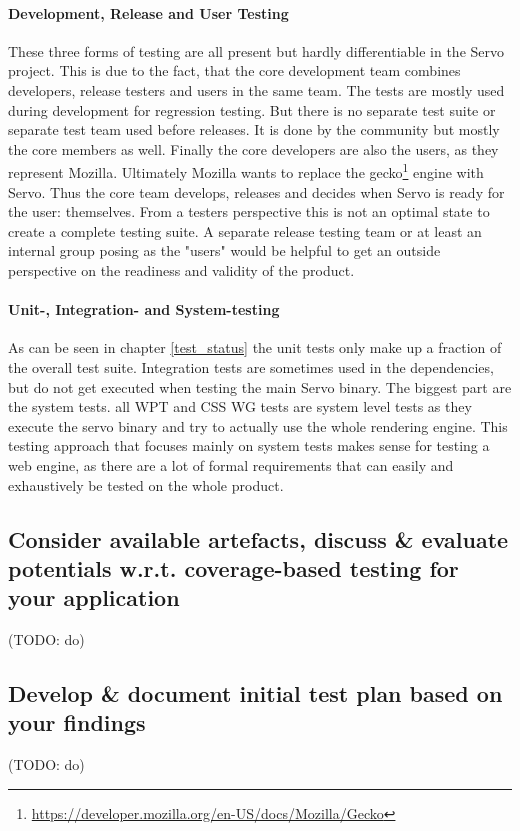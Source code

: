 \documentclass{scrartcl}
\newcommand{\todo}[1] {{\color{red}(TODO: #1)}}
\begin{document}
\paragraph{Development, Release and User Testing}
These three forms of testing are all present but hardly differentiable in the Servo project. This is due to the fact, that the core development team combines developers, release testers and users in the same team. The tests are mostly used during development for regression testing. But there is no separate test suite or separate test team used before releases. It is done by the community but mostly the core members as well. Finally the core developers are also the users, as they represent Mozilla. Ultimately Mozilla wants to replace the gecko\footnote{\url{https://developer.mozilla.org/en-US/docs/Mozilla/Gecko}} engine with Servo. Thus the core team develops, releases and decides when Servo is ready for the user: themselves. From a testers perspective this is not an optimal state to create a complete testing suite. A separate release testing team or at least an internal group posing as the "users" would be helpful to get an outside perspective on the readiness and validity of the product.

\paragraph{Unit-, Integration- and System-testing}
As can be seen in chapter \ref{test_status} the unit tests only make up a fraction of the overall test suite. Integration tests are sometimes used in the dependencies, but do not get executed when testing the main Servo binary. The biggest part are the system tests. all WPT and CSS WG tests are system level tests as they execute the servo binary and try to actually use the whole rendering engine. This testing approach that focuses mainly on system tests makes sense for testing a web engine, as there are a lot of formal requirements that can easily and exhaustively be tested on the whole product.

\subsection{Consider available artefacts, discuss \& evaluate potentials w.r.t. coverage-based testing for your application}
\todo{do}

\subsection{Develop \& document initial test plan based on your findings}
\todo{do}
\end{document}
